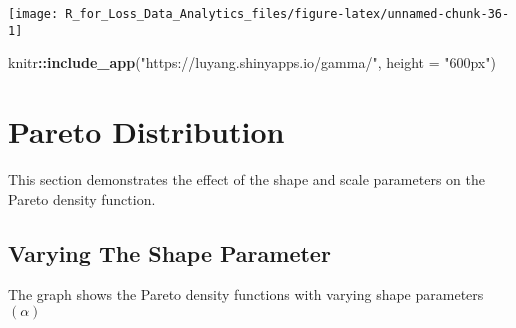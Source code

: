 \documentclass[]{book}
\newenvironment{Shaded}{\begin{snugshade}}{\end{snugshade}}
\newcommand{\KeywordTok}[1]{\textcolor[rgb]{0.13,0.29,0.53}{\textbf{#1}}}
\newcommand{\DataTypeTok}[1]{\textcolor[rgb]{0.13,0.29,0.53}{#1}}
\newcommand{\StringTok}[1]{\textcolor[rgb]{0.31,0.60,0.02}{#1}}
\newcommand{\OperatorTok}[1]{\textcolor[rgb]{0.81,0.36,0.00}{\textbf{#1}}}
\newcommand{\NormalTok}[1]{#1}
\theoremstyle{definition}
\theoremstyle{definition}
\theoremstyle{definition}
\theoremstyle{remark}
\begin{document}
\begin{center}\texttt{[image: R\_for\_Loss\_Data\_Analytics\_files/figure-latex/unnamed-chunk-36-1]} \end{center}

\begin{Shaded}
\begin{Highlighting}[]
\NormalTok{knitr}\OperatorTok{::}\KeywordTok{include_app}\NormalTok{(}\StringTok{"https://luyang.shinyapps.io/gamma/"}\NormalTok{, }
  \DataTypeTok{height =} \StringTok{"600px"}\NormalTok{)}
\end{Highlighting}
\end{Shaded}

\section{Pareto Distribution}\label{pareto-distribution}

This section demonstrates the effect of the shape and scale parameters
on the Pareto density function.

\subsection{Varying The Shape
Parameter}\label{varying-the-shape-parameter-1}

The graph shows the Pareto density functions with varying shape
parameters \((\alpha)\)
\end{document}
